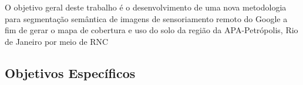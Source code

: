 \documentclass[%
  10pt,%
  aspectratio = 169,%
  compress,%
  t,%
  english,%
  brazilian,%
  tikz,
]{beamer}
\begin{document}
\begin{frame}
O objetivo geral deste trabalho é o desenvolvimento de uma nova metodologia para segmentação semântica de imagens de sensoriamento remoto do Google a fim de gerar o mapa de cobertura e uso do solo da região da APA-Petrópolis, Rio de Janeiro por meio de RNC
\end{frame}

\subsection{Objetivos Específicos}\label{sec:intro2}
\end{document}
